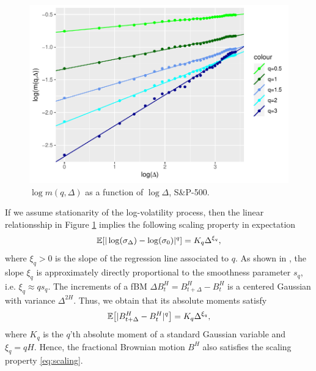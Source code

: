 \begin{figure}[H]
    \centering
    \includegraphics[scale=0.78]{fig/img/RealizedLib/Linear_Reg_rigtig.pdf}
    \caption{$\log m(q,\Delta)$ as a function of $\log\Delta$, S\&P-500.}
    \label{fig: Linear_reg}
\end{figure}
 If we assume stationarity of the log-volatility process, then the linear relationsship in Figure \ref{fig: Linear_reg} implies the following scaling property in expectation
 \begin{equation}\label{eq:scaling}
     \mathbb{E}[|\log(\sigma_{\Delta})-\log(\sigma_{0})|^{q}]=K_{q}\Delta^{\xi_{q}},
 \end{equation}
 where $\xi_{q}>0$ is the slope of the regression line associated to $q$. As shown in \cite{volisrough}, the slope $\xi_{q}$ is approximately directly proportional to the smoothness parameter $s_{q}$, i.e. $\xi_{q}\approx qs_{q}$. The increments of a fBM $\Delta B_{t}^{H}=B_{t+\Delta}^{H}-B_{t}^{H}$ is a centered Gaussian with variance $\Delta^{2H}$. Thus, we obtain that its absolute moments satisfy 
 \begin{equation}
     \E\left[|B^{H}_{t+\Delta}-B_{t}^{H}|^{q}\right]=K_{q}\Delta^{\xi_{q}},
 \end{equation}
 where $K_{q}$ is the $q$'th absolute moment of a standard Gaussian variable and $\xi_{q}=qH$. Hence, the fractional Brownian motion $B^{H}$ also satisfies the scaling property \eqref{eq:scaling}. 
 
